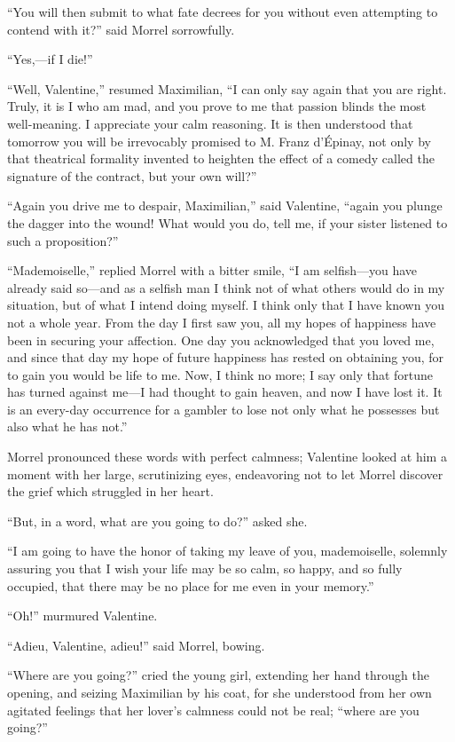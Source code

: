 “You will then submit to what fate decrees for you without even
attempting to contend with it?” said Morrel sorrowfully.

“Yes,—if I die!”

“Well, Valentine,” resumed Maximilian, “I can only say again that you
are right. Truly, it is I who am mad, and you prove to me that passion
blinds the most well-meaning. I appreciate your calm reasoning. It is
then understood that tomorrow you will be irrevocably promised to M.
Franz d’Épinay, not only by that theatrical formality invented to
heighten the effect of a comedy called the signature of the contract,
but your own will?”

“Again you drive me to despair, Maximilian,” said Valentine, “again you
plunge the dagger into the wound! What would you do, tell me, if your
sister listened to such a proposition?”

“Mademoiselle,” replied Morrel with a bitter smile, “I am selfish—you
have already said so—and as a selfish man I think not of what others
would do in my situation, but of what I intend doing myself. I think
only that I have known you not a whole year. From the day I first saw
you, all my hopes of happiness have been in securing your affection.
One day you acknowledged that you loved me, and since that day my hope
of future happiness has rested on obtaining you, for to gain you would
be life to me. Now, I think no more; I say only that fortune has turned
against me—I had thought to gain heaven, and now I have lost it. It is
an every-day occurrence for a gambler to lose not only what he
possesses but also what he has not.”

Morrel pronounced these words with perfect calmness; Valentine looked
at him a moment with her large, scrutinizing eyes, endeavoring not to
let Morrel discover the grief which struggled in her heart.

“But, in a word, what are you going to do?” asked she.

“I am going to have the honor of taking my leave of you, mademoiselle,
solemnly assuring you that I wish your life may be so calm, so happy,
and so fully occupied, that there may be no place for me even in your
memory.”

“Oh!” murmured Valentine.

“Adieu, Valentine, adieu!” said Morrel, bowing.

“Where are you going?” cried the young girl, extending her hand through
the opening, and seizing Maximilian by his coat, for she understood
from her own agitated feelings that her lover’s calmness could not be
real; “where are you going?”

